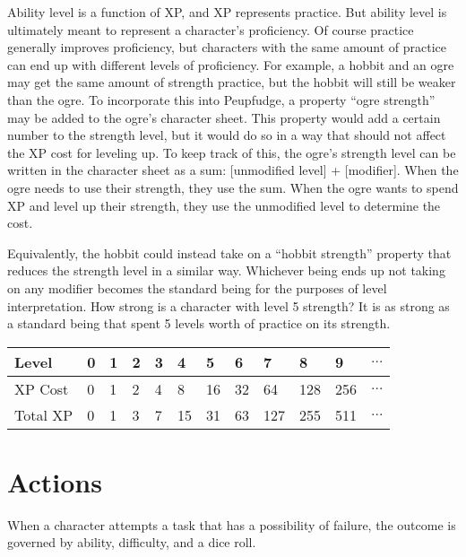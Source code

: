 Ability level is a function of XP, and XP represents practice.
But ability level is ultimately meant to represent a character's proficiency.
Of course practice generally improves proficiency, but characters with the same amount of practice can end up with different levels of proficiency.
For example, a hobbit and an ogre may get the same amount of strength practice, but the hobbit will still be weaker than the ogre.
To incorporate this into Peupfudge, a property ``ogre strength'' may be added to the ogre’s character sheet.
This property would add a certain number to the strength level, but it would do so in a way that should not affect the XP cost for leveling up.
To keep track of this, the ogre’s strength level can be written in the character sheet as a sum: [unmodified level] + [modifier].
When the ogre needs to use their strength, they use the sum.
When the ogre wants to spend XP and level up their strength, they use the unmodified level to determine the cost.

Equivalently, the hobbit could instead take on a “hobbit strength” property that reduces the strength level in a similar way.
Whichever being ends up not taking on any modifier becomes the standard being for the purposes of level interpretation.
How strong is a character with level 5 strength?
It is as strong as a standard being that spent 5 levels worth of practice on its strength.

\begin{center}
\begin{tabular}{|l|l|l|l|l|l|l|l|l|l|l|l|}
\hline
Level    & 0 & 1 & 2 & 3 & 4  & 5  & 6  & 7   & 8   & 9   & $\ldots$ \\ \hline
XP Cost  & 0 & 1 & 2 & 4 & 8  & 16 & 32 & 64  & 128 & 256 & $\ldots$ \\ \hline
Total XP & 0 & 1 & 3 & 7 & 15 & 31 & 63 & 127 & 255 & 511 & $\ldots$ \\ \hline
\end{tabular}
\end{center}


\section*{Actions}
When a character attempts a task that has a possibility of failure, the outcome is governed by ability, difficulty, and a dice roll. 

